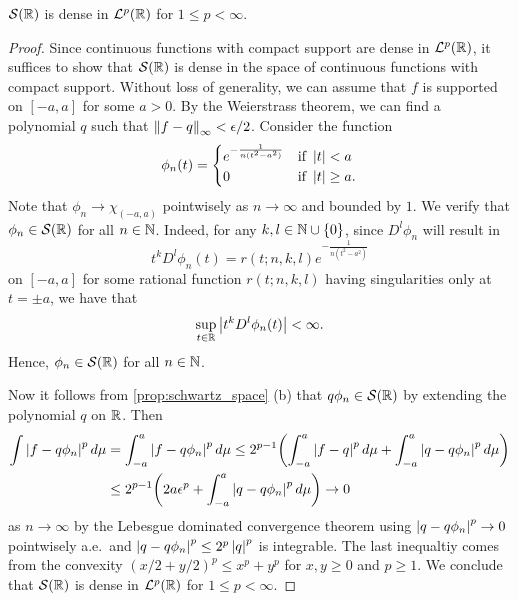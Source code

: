 \begin{proposition}\label{prop:schwartz_dense}
    $\mathcal{S}(\mathbb{R})$ is dense in $\mathcal{L}^p(\mathbb{R})$ for $1\leq p<\infty$.
\end{proposition}
\begin{proof}
    Since continuous functions with compact support are dense in $\mathcal{L}^p(\mathbb{R})$, 
    it suffices to show that $\mathcal{S}(\mathbb{R})$ is dense in the space of continuous functions 
    with compact support. Without loss of generality, we can assume that $f$ is 
    supported on $[-a,a]$ for some $a>0$. By the Weierstrass theorem, we can find 
    a polynomial $q$ such that $\left\lVert {f-q} \right\rVert_\infty < \epsilon/2$. Consider the 
    function 
    \begin{equation*}
        \phi_n(t) = \begin{cases}
            e^{-\frac{1}{n(t^2 - a^2)}} & \text{if } \left\lvert {t} \right\rvert < a \\
            0 & \text{if } \left\lvert {t} \right\rvert \geq a.
        \end{cases}
    \end{equation*}
    Note that $\phi_n\to\chi_{(-a,a)}$ pointwisely as $n\to\infty$ and 
    bounded by $1$. We verify that $\phi_n\in\mathcal{S}(\mathbb{R})$ for all $n\in\mathbb{N}$. 
    Indeed, for any $k,l\in\mathbb{N}\cup\left\{ {0} \right\}$, since $D^l\phi_n$ will result in 
    \begin{equation*}
        t^kD^l\phi_n(t) = r(t;n,k,l)e^{-\frac{1}{n(t^2-a^2)}} 
    \end{equation*}
    on $[-a,a]$ for some rational function $r(t;n,k,l)$ having singularities 
    only at $t=\pm a$, we have that 
    \begin{equation*}
        \sup_{t\in\mathbb{R}}\left\lvert {t^kD^l\phi_n(t)} \right\rvert < \infty.
    \end{equation*}
    Hence, $\phi_n\in\mathcal{S}(\mathbb{R})$ for all $n\in\mathbb{N}$. 

    Now it follows from \cref{prop:schwartz_space} (b) that $q\phi_n\in\mathcal{S}(\mathbb{R})$ 
    by extending the polynomial $q$ on $\mathbb{R}$. Then 
    \begin{equation*}
        \begin{split}
            \int\abs{f-q\phi_n}^pd\mu &= \int_{-a}^{a} \abs{f-q\phi_n}^pd\mu 
            \leq 2^{p-1}\pth{\int_{-a}^{a}\abs{f-q}^pd\mu + \int_{-a}^{a}\abs{q-q\phi_n}^pd\mu} \\
            &\leq 2^{p-1}\pth{2a\epsilon^p + \int_{-a}^{a}\abs{q-q\phi_n}^pd\mu} \to 0
        \end{split}
    \end{equation*}
    as $n\to\infty$ by the Lebesgue dominated convergence theorem using $\left\lvert {q-q\phi_n} \right\rvert^p\to 0$
    pointwisely a.e.\ and $\left\lvert {q-q\phi_n} \right\rvert^p\leq 2^p\left\lvert {q} \right\rvert^p$ is integrable. The 
    last inequaltiy comes from the convexity $(x/2+y/2)^p\leq x^p+y^p$ for $x,y\geq 0$ 
    and $p\geq 1$. We conclude that $\mathcal{S}(\mathbb{R})$ is dense in $\mathcal{L}^p(\mathbb{R})$ for $1\leq p<\infty$.
\end{proof}

